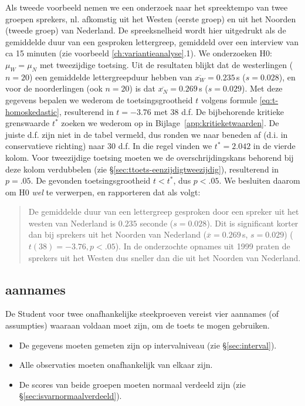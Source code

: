 \documentclass[
]{book}
\begin{document}
Als tweede voorbeeld nemen we een onderzoek naar het spreektempo van
twee groepen sprekers, nl. afkomstig uit het Westen (eerste groep) en
uit het Noorden (tweede groep) van Nederland. De spreeksnelheid wordt
hier uitgedrukt als de gemiddelde duur van een gesproken lettergreep,
gemiddeld over een interview van ca 15 minuten (zie voorbeeld \ref{ch:variantieanalyse}.1).
We onderzoeken H0: \(\mu_W = \mu_N\) met
tweezijdige toetsing. Uit de resultaten blijkt dat de westerlingen
(\(n=20\)) een gemiddelde lettergreepduur hebben van
\(\overline{x_W}=0.235\) s (\(s=0.028\)), en voor de noorderlingen (ook
\(n=20\)) is dat \(\overline{x_N}=0.269\) s (\(s=0.029\)). Met deze gegevens
bepalen we wederom de toetsingsgrootheid \(t\) volgens formule
\eqref{eq:t-homoskedastic}, resulterend in \(t=-3.76\) met 38 d.f. De
bijbehorende kritieke grenswaarde \(t^*\) zoeken we wederom op in
Bijlage~\ref{app:kritieketwaarden}. De juiste d.f. zijn niet in de tabel
vermeld, dus ronden we naar beneden af (d.i. in conservatieve richting)
naar 30 d.f. In die regel vinden we \(t^*=2.042\) in de vierde kolom. Voor
tweezijdige toetsing moeten we de overschrijdingskans behorend bij deze
kolom verdubbelen (zie
§\ref{sec:ttoets-eenzijdigtweezijdig}), resulterend in \(p=.05\). De
gevonden toetsingsgrootheid \(t < t^*\), dus \(p<.05\). We besluiten daarom
om H0 \emph{wel} te verwerpen, en rapporteren dat als volgt:

\begin{quote}
De gemiddelde duur van een lettergreep gesproken door een spreker uit
het westen van Nederland is \(0.235\) seconde (\(s=0.028\)). Dit is
significant korter dan bij sprekers uit het Noorden van Nederland
(\(\overline{x}=0.269\) s, \(s=0.029\)) (\(t(38)=-3.76, p<.05\)). In de
onderzochte opnames uit 1999 praten de sprekers uit het Westen dus
sneller dan die uit het Noorden van Nederland.
\end{quote}

\hypertarget{aannames}{%
\subsection{aannames}\label{aannames}}

De Student voor twee onafhankelijke steekproeven vereist vier aannames
(of assumpties) waaraan voldaan moet zijn, om de toets te mogen
gebruiken.

\begin{itemize}
\item
  De gegevens moeten gemeten zijn op intervalniveau (zie
  §\ref{sec:interval}).
\item
  Alle observaties moeten onafhankelijk van elkaar zijn.
\item
  De scores van beide groepen moeten normaal verdeeld zijn (zie
  §\ref{sec:isvarnormaalverdeeld}).
\end{itemize}
\end{document}
